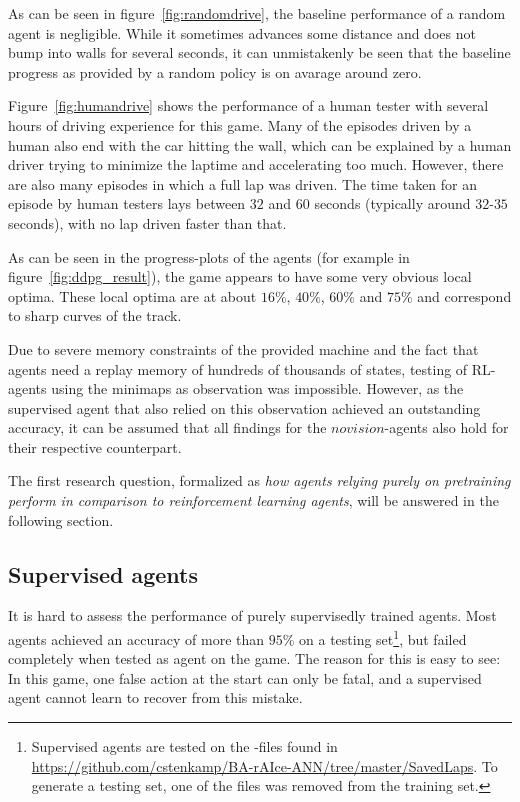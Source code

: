 As can be seen in figure~\ref{fig:randomdrive}, the baseline performance of a random agent is negligible. While it sometimes advances some distance and does not bump into walls for several seconds, it can unmistakenly be seen that the baseline progress as provided by a random policy is on avarage around zero.

Figure~\ref{fig:humandrive} shows the performance of a human tester with several hours of driving experience for this game. Many of the episodes driven by a human also end with the car hitting the wall, which can be explained by a human driver trying to minimize the laptime and accelerating too much. However, there are also many episodes in which a full lap was driven. The time taken for an episode by human testers lays between $32$ and $60$ seconds (typically around $32$-$35$ seconds), with no lap driven faster than that.

As can be seen in the progress-plots of the agents (for example in figure~\ref{fig:ddpg_result}), the game appears to have some very obvious local optima. These local optima are at about $16\%$, $40\%$, $60\%$ and $75\%$ and correspond to sharp curves of the track.

Due to severe memory constraints of the provided machine and the fact that agents need a replay memory of hundreds of thousands of states, testing of RL-agents using the minimaps as observation was impossible. However, as the supervised agent that also relied on this observation achieved an outstanding accuracy, it can be assumed that all findings for the $novision$-agents also hold for their respective counterpart.

The first research question, formalized as \textit{how agents relying purely on pretraining perform in comparison to reinforcement learning agents}, will be answered in the following section.

\subsection{Supervised agents}
\label{sec:resultsupervised}

It is hard to assess the performance of purely supervisedly trained agents. Most agents achieved an accuracy of more than $95\%$ on a testing set\footnote{Supervised agents are tested on the -files found in \url{https://github.com/cstenkamp/BA-rAIce-ANN/tree/master/SavedLaps}. To generate a testing set, one of the files was removed from the training set.}, but failed completely when tested as agent on the game. The reason for this is easy to see: In this game, one false action at the start can only be fatal, and a supervised agent cannot learn to recover from this mistake.

